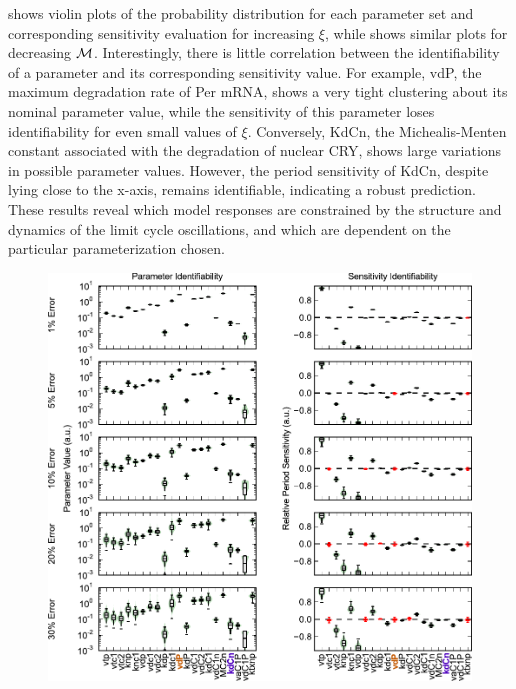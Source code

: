 { shows violin plots of the probability distribution for each parameter set and corresponding sensitivity evaluation for increasing $\xi$, while  shows similar plots for decreasing $\cal M$. 
Interestingly, there is little correlation between the identifiability of a parameter and its corresponding sensitivity value. 
For example, vdP, the maximum degradation rate of Per mRNA, shows a very tight clustering about its nominal parameter value, while the sensitivity of this parameter loses identifiability for even small values of $\xi$. 
Conversely, KdCn, the Michealis-Menten constant associated with the degradation of nuclear CRY, shows large variations in possible parameter values. 
However, the period sensitivity of KdCn, despite lying close to the x-axis, remains identifiable, indicating a robust prediction. 
These results reveal which model responses are constrained by the structure and dynamics of the limit cycle oscillations, and which are dependent on the particular parameterization chosen.

\begin{figure}[p]
  \centering
  \includegraphics{chap3/figures/fig3.pdf}
  \label{fig:3_3}
\end{figure}

}
